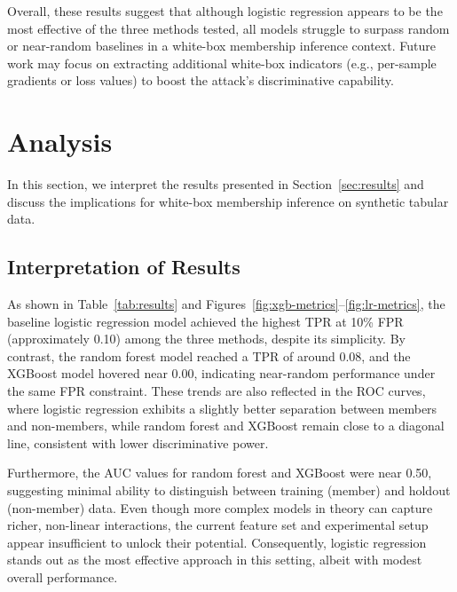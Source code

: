 \documentclass[12pt]{article}
\begin{document}
Overall, these results suggest that although logistic regression appears to be the most effective of the three methods tested, all models struggle to surpass random or near-random baselines in a white-box membership inference context. Future work may focus on extracting additional white-box indicators (e.g., per-sample gradients or loss values) to boost the attack’s discriminative capability.

\section{Analysis}
\label{sec:analysis}
In this section, we interpret the results presented in Section~\ref{sec:results} and discuss the implications for white-box membership inference on synthetic tabular data.

\subsection*{Interpretation of Results}
As shown in Table~\ref{tab:results} and Figures~\ref{fig:xgb-metrics}--\ref{fig:lr-metrics}, the baseline logistic regression model achieved the highest TPR at 10\% FPR (approximately 0.10) among the three methods, despite its simplicity. By contrast, the random forest model reached a TPR of around 0.08, and the XGBoost model hovered near 0.00, indicating near-random performance under the same FPR constraint. These trends are also reflected in the ROC curves, where logistic regression exhibits a slightly better separation between members and non-members, while random forest and XGBoost remain close to a diagonal line, consistent with lower discriminative power.

Furthermore, the AUC values for random forest and XGBoost were near 0.50, suggesting minimal ability to distinguish between training (member) and holdout (non-member) data. Even though more complex models in theory can capture richer, non-linear interactions, the current feature set and experimental setup appear insufficient to unlock their potential. Consequently, logistic regression stands out as the most effective approach in this setting, albeit with modest overall performance.
\end{document}
